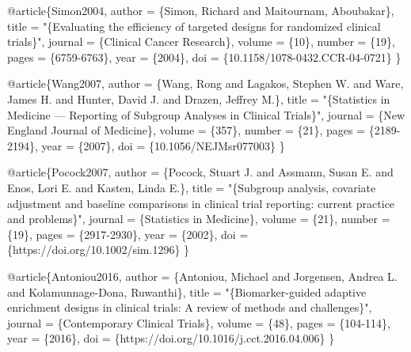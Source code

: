 \documentclass[
  letterpaper,
  DIV=11,
  numbers=noendperiod]{scrartcl}
\newenvironment{Shaded}{\begin{snugshade}}{\end{snugshade}}
\newcommand{\DataTypeTok}[1]{\textcolor[rgb]{0.68,0.00,0.00}{#1}}
\newcommand{\NormalTok}[1]{\textcolor[rgb]{0.00,0.23,0.31}{#1}}
\newcommand{\OtherTok}[1]{\textcolor[rgb]{0.00,0.23,0.31}{#1}}
\newcommand{\StringTok}[1]{\textcolor[rgb]{0.13,0.47,0.30}{#1}}
\newcommand{\VariableTok}[1]{\textcolor[rgb]{0.07,0.07,0.07}{#1}}
\begin{document}
\begin{Shaded}
\begin{Highlighting}[]
\VariableTok{@article}\NormalTok{\{}\OtherTok{Simon2004}\NormalTok{,}
    \DataTypeTok{author}\NormalTok{ = \{Simon, Richard and Maitournam, Aboubakar\},}
    \DataTypeTok{title}\NormalTok{ = "}\StringTok{\{Evaluating the efficiency of targeted designs for randomized clinical trials\}}\NormalTok{",}
    \DataTypeTok{journal}\NormalTok{ = \{Clinical Cancer Research\},}
    \DataTypeTok{volume}\NormalTok{ = \{10\},}
    \DataTypeTok{number}\NormalTok{ = \{19\},}
    \DataTypeTok{pages}\NormalTok{ = \{6759{-}6763\},}
    \DataTypeTok{year}\NormalTok{ = \{2004\},}
    \DataTypeTok{doi}\NormalTok{ = \{10.1158/1078{-}0432.CCR{-}04{-}0721\}}
\NormalTok{\}}

\VariableTok{@article}\NormalTok{\{}\OtherTok{Wang2007}\NormalTok{,}
    \DataTypeTok{author}\NormalTok{ = \{Wang, Rong and Lagakos, Stephen W. and Ware, James H. and Hunter, David J. and Drazen, Jeffrey M.\},}
    \DataTypeTok{title}\NormalTok{ = "}\StringTok{\{Statistics in Medicine — Reporting of Subgroup Analyses in Clinical Trials\}}\NormalTok{",}
    \DataTypeTok{journal}\NormalTok{ = \{New England Journal of Medicine\},}
    \DataTypeTok{volume}\NormalTok{ = \{357\},}
    \DataTypeTok{number}\NormalTok{ = \{21\},}
    \DataTypeTok{pages}\NormalTok{ = \{2189{-}2194\},}
    \DataTypeTok{year}\NormalTok{ = \{2007\},}
    \DataTypeTok{doi}\NormalTok{ = \{10.1056/NEJMsr077003\}}
\NormalTok{\}}

\VariableTok{@article}\NormalTok{\{}\OtherTok{Pocock2007}\NormalTok{,}
    \DataTypeTok{author}\NormalTok{ = \{Pocock, Stuart J. and Assmann, Susan E. and Enos, Lori E. and Kasten, Linda E.\},}
    \DataTypeTok{title}\NormalTok{ = "}\StringTok{\{Subgroup analysis, covariate adjustment and baseline comparisons in clinical trial reporting: current practice and problems\}}\NormalTok{",}
    \DataTypeTok{journal}\NormalTok{ = \{Statistics in Medicine\},}
    \DataTypeTok{volume}\NormalTok{ = \{21\},}
    \DataTypeTok{number}\NormalTok{ = \{19\},}
    \DataTypeTok{pages}\NormalTok{ = \{2917{-}2930\},}
    \DataTypeTok{year}\NormalTok{ = \{2002\},}
    \DataTypeTok{doi}\NormalTok{ = \{https://doi.org/10.1002/sim.1296\}}
\NormalTok{\}}

\VariableTok{@article}\NormalTok{\{}\OtherTok{Antoniou2016}\NormalTok{,}
    \DataTypeTok{author}\NormalTok{ = \{Antoniou, Michael and Jorgensen, Andrea L. and Kolamunnage{-}Dona, Ruwanthi\},}
    \DataTypeTok{title}\NormalTok{ = "}\StringTok{\{Biomarker{-}guided adaptive enrichment designs in clinical trials: A review of methods and challenges\}}\NormalTok{",}
    \DataTypeTok{journal}\NormalTok{ = \{Contemporary Clinical Trials\},}
    \DataTypeTok{volume}\NormalTok{ = \{48\},}
    \DataTypeTok{pages}\NormalTok{ = \{104{-}114\},}
    \DataTypeTok{year}\NormalTok{ = \{2016\},}
    \DataTypeTok{doi}\NormalTok{ = \{https://doi.org/10.1016/j.cct.2016.04.006\}}
\NormalTok{\}}


\end{Highlighting}
\end{Shaded}
\end{document}
